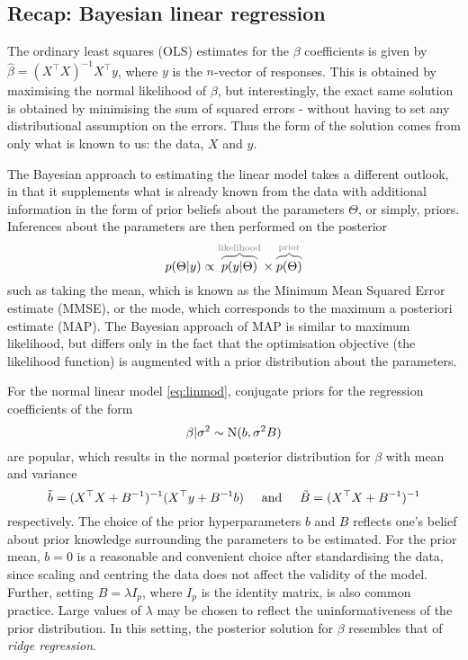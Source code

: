 \subsection{Recap: Bayesian linear regression}

The ordinary least squares (OLS) estimates for the $\beta$ coefficients is given by $\hat\beta = (X^\top X)^{-1} X^\top y$, where $y$ is the $n$-vector of responses.
This is obtained by maximising the normal likelihood of $\beta$, but interestingly, the exact same solution is obtained by minimising the sum of squared errors - without having to set any distributional assumption on the errors. 
Thus the form of the solution comes from only what is known to us: the data, $X$ and $y$.

The Bayesian approach to estimating the linear model takes a different outlook, in that it supplements what is already known from the data with additional information in the form of prior beliefs about the parameters $\Theta$, or simply, priors. 
Inferences about the parameters are then performed on the posterior
\[
  p(\Theta|y) \propto 
  {\color{gray} \overbrace{\color{black} p(y|\Theta)}^{\text{likelihood}}} 
  \times 
  {\color{gray} \overbrace{\color{black} p(\Theta)}^{\text{prior}}}
\]
such as taking the mean, which is known as the Minimum Mean Squared Error estimate (MMSE), or the mode, which corresponds to the maximum a posteriori estimate (MAP).
The Bayesian approach of MAP is similar to maximum likelihood, but differs only in the fact that the optimisation objective (the likelihood function) is augmented with a prior distribution about the parameters. 

For the normal linear model \eqref{eq:linmod}, conjugate priors for the regression coefficients of the form
\[
  \beta | \sigma^2 \sim \operatorname{N}(b, \sigma^2 B) 
\]
are popular, which results in the normal posterior distribution for $\beta$ with mean and variance
\[
  \tilde b = (X^\top X + B^{-1})^{-1}(X^\top y + B^{-1}b) \hspace{0.5cm}\text{and}\hspace{0.5cm} \tilde B = (X^\top X + B^{-1})^{-1}
\]
respectively.
The choice of the prior hyperparameters $b$ and $B$ reflects one's belief about prior knowledge surrounding the parameters to be estimated.
For the prior mean, $b = 0$ is a reasonable and convenient choice after standardising the data, since scaling and centring the data does not affect the validity of the model.
Further, setting $B = \lambda I_p$, where $I_p$ is the identity matrix, is also common practice.
Large values of $\lambda$ may be chosen to reflect the uninformativeness of the prior distribution.
In this setting, the posterior solution for $\beta$ resembles that of \emph{ridge regression}.

